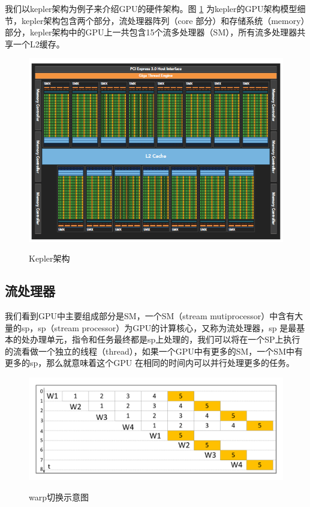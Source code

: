 我们以kepler架构为例子来介绍GPU的硬件架构。图 \ref{KPA} 为kepler的GPU架构模型细节，kepler架构包含两个部分，流处理器阵列（core 部分）和存储系统（memory）部分，kepler架构中的GPU上一共包含15个流多处理器（SM），所有流多处理器共享一个L2缓存。
\begin{figure}
\setlength{\belowcaptionskip}{-0.5cm}
  \begin{center}
    {\includegraphics[width=1 \textwidth]{figures/arc.png}}
    \end{center}
  \caption{{\footnotesize{Kepler架构}}}
  \label{KPA}
\end{figure}
\subsection {流处理器}
我们看到GPU中主要组成部分是SM，一个SM（stream mutiprocessor）中含有大量的sp，sp（stream processor）为GPU的计算核心，又称为流处理器，sp 是最基本的处办理单元，指令和任务最终都是sp上处理的，我们可以将在一个SP上执行的流看做一个独立的线程（thread），如果一个GPU中有更多的SM，一个SM中有更多的sp，那么就意味着这个GPU 在相同的时间内可以并行处理更多的任务。
\begin{figure}
\setlength{\belowcaptionskip}{-0.5cm}
  \begin{center}
    {\includegraphics[width=1 \textwidth]{figures/warpsketch.pdf}}
    \end{center}
  \caption{{\footnotesize{warp切换示意图}}}
  \label{wps}
\end{figure}

